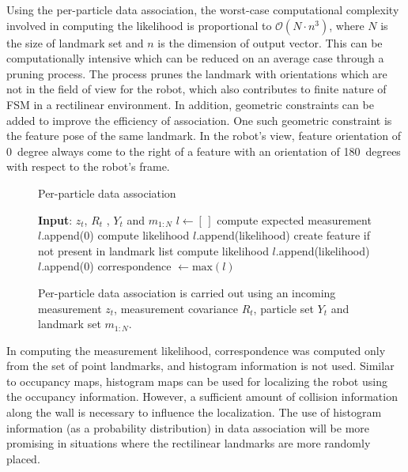 Using the per-particle data association, the worst-case computational complexity involved in computing the likelihood is proportional to $\mathcal{O}(N\cdot n^3)$, where $N$ is the size of landmark set and $n$ is the dimension of output vector. This can be computationally intensive which can be reduced on an average case through a pruning process. The process prunes the landmark with orientations which are not in the field of view for the robot, which also contributes to finite nature of FSM in a rectilinear environment. In addition, geometric constraints can be added to improve the efficiency of association. One such geometric constraint is the feature pose of the same landmark. In the robot's view, feature orientation of 0~degree always come to the right of a feature with an orientation of 180~degrees with respect to the robot's frame.   
 
\begin{figure}
\begin{algorithm}[H]
\caption{Per-particle data association} \label{ppda}
\begin{algorithmic}[1]
\BState \textbf{Input}: $z_t$, $R_t$ , $Y_t$ and $m_{1:N}$
\State $l \gets \left[\,\right]$
\State compute expected measurement
\State $l$.append(0)
\EndIf
{}
\State compute likelihood
\State $l$.append(likelihood)
\State create feature if not present in landmark list
\State compute likelihood
\State $l$.append(likelihood)
\Else 
\State $l$.append(0)
\EndIf
\EndFor
\State \Return correspondence $\gets \text{max}(l)$
\EndFor
\end{algorithmic}
\end{algorithm}
\caption[Per-particle data association algorithm]{Per-particle data association is carried out using an incoming measurement $z_t$, measurement covariance $R_t$, particle set $Y_t$ and landmark set $m_{1:N}$.}
\end{figure}

In computing the measurement likelihood, correspondence was computed only from the set of point landmarks, and histogram information is not used. Similar to occupancy maps, histogram maps can be used for localizing the robot using the occupancy information. However, a sufficient amount of collision information along the wall is necessary to influence the localization. The use of histogram information (as a probability distribution) in data association will be more promising in situations where the rectilinear landmarks are more randomly placed.  

